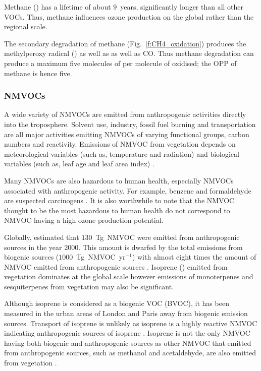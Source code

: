 Methane () has a lifetime of about $9$~years, significantly longer than all other VOCs.
Thus, methane influences ozone production on the global rather than the regional scale.  

The secondary degradation of methane (Fig.~\ref{f:CH4_oxidation}) produces the methylperoxy radical () as well as  as well as CO.
Thus methane degradation can produce a maximum five molecules of  per molecule of  oxidised; the OPP of methane is hence five.

\subsubsection{NMVOCs}
A wide variety of NMVOCs are emitted from anthropogenic activities directly into the troposphere.
Solvent use, industry, fossil fuel burning and transportation are all major activities emitting NMVOCs of varying functional groups, carbon numbers and reactivity.
Emissions of NMVOC from vegetation depends on meteorological variables (such as, temperature and radiation) and biological variables (such as, leaf age and leaf area index) \citep{Guenther:2012}.

Many NMVOCs are also hazardous to human health, especially NMVOCs associated with anthropogenic activity.
For example, benzene and formaldehyde are suspected carcinogens \citep{Laurent:2014}.
It is also worthwhile to note that the NMVOC thought to be the most hazardous to human health do not correspond to NMVOC having a high ozone production potential.

Globally, \citet{Lamarque:2010} estimated that $130$~Tg~NMVOC were emitted from anthropogenic sources in the year 2000.
This amount is dwarfed by the total emissions from biogenic sources ($1000$~Tg~NMVOC~yr$^{-1}$) with almost eight times the amount of NMVOC emitted from anthropogenic sources \citep{Guenther:2012}.
Isoprene () emitted from vegetation dominates at the global scale however emissions of monoterpenes and sesquiterpenes from vegetation may also be significant.

Although isoprene is considered as a biogenic VOC (BVOC), it has been measured in the urban areas of London and Paris away from biogenic emission sources.
Transport of isoprene is unlikely as isoprene is a highly reactive NMVOC indicating anthropogenic sources of isoprene \citep{vonSchneidemesser:2011}.
Isoprene is not the only NMVOC having both biogenic and anthropogenic sources as other NMVOC that emitted from anthropogenic sources, such as methanol and acetaldehyde, are also emitted from vegetation \citep{Guenther:2012}.

